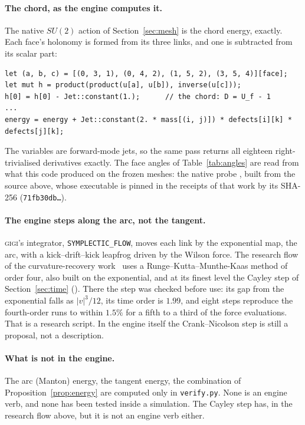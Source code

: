 \documentclass[11pt]{article}
\begin{document}
\paragraph{The chord, as the engine computes it.} The native $SU(2)$ action of
Section~\ref{sec:mesh} is the chord energy, exactly. Each face's holonomy is formed from its
three links, and one is subtracted from its scalar part:
\begin{lstlisting}[style=rust]
let (a, b, c) = [(0, 3, 1), (0, 4, 2), (1, 5, 2), (3, 5, 4)][face];
let mut h = product(product(u[a], u[b]), inverse(u[c]));
h[0] = h[0] - Jet::constant(1.);      // the chord: D = U_f - 1
...
energy = energy + Jet::constant(2. * mass[(i, j)]) * defects[i][k] * defects[j][k];
\end{lstlisting}
The variables are forward-mode jets, so the same pass returns all eighteen right-trivialised
derivatives exactly. The face angles of Table~\ref{tab:angles} are read from what this
code produced on the frozen meshes: the native probe ,
built from the source above, whose executable is pinned in the receipts of that work by its
SHA-256 (\texttt{71fb30db\ldots}).

\paragraph{The engine steps along the arc, not the tangent.} \textsc{gigi}'s integrator,
\texttt{SYMPLECTIC\_FLOW}, moves each link by the exponential map, the arc, with a
kick--drift--kick leapfrog driven by the Wilson force. The research flow of the
curvature-recovery work~\cite{davis-rtc} uses a Runge--Kutta--Munthe-Kaas method of order
four, also built on the exponential, and at its finest level the Cayley step of
Section~\ref{sec:time} (). There the step was
checked before use: its gap from the exponential falls as $|v|^3/12$, its time order is
$1.99$, and eight steps reproduce the fourth-order runs to within $1.5\%$ for a fifth to a
third of the force evaluations. That is a research script. In the engine itself the
Crank--Nicolson step is still a proposal, not a description.

\paragraph{What is not in the engine.} The arc (Manton) energy, the tangent energy, the
combination of Proposition~\ref{prop:energy} are computed only in \texttt{verify.py}. None is
an engine verb, and none has been tested inside a simulation. The Cayley step has, in the
research flow above, but it is not an engine verb either.
\end{document}
